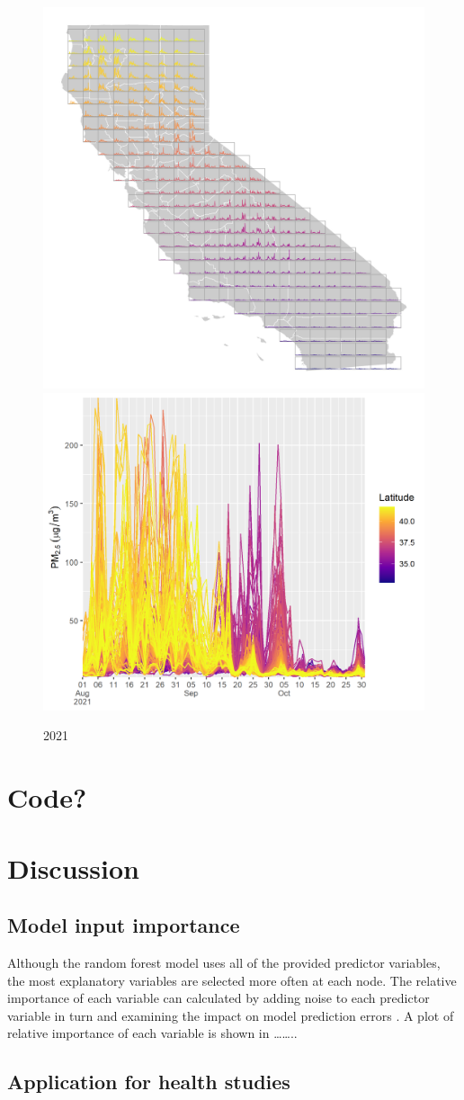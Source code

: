 \documentclass[gmd, manuscript]{copernicus}
\begin{document}
\begin{figure}
\includegraphics[width=0.4\linewidth]{./Figures/Sparkmap2021} \includegraphics[width=0.4\linewidth]{./Figures/SparkLegend2021} \caption{2021}\label{fig:res_2021}
\end{figure}

\section{Code?}

\section{Discussion}

\subsection{Model input importance}

Although the random forest model uses all of the provided predictor
variables, the most explanatory variables are selected more often at
each node. The relative importance of each variable can calculated by
adding noise to each predictor variable in turn and examining the impact
on model prediction errors \citep{Breiman2001}. A plot of relative
importance of each variable is shown in \ldots\ldots..

\subsection{Application for health studies}
\end{document}
